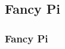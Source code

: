    	     \subsection[]{Fancy Pi}
   	     \begin{frame}
   	     	\frametitle{Fancy Pi}
   	     	
   	     	   \def\defaultstartht{20pt}
   	     	   \diminish[0.97]{\pinum}
   	     	   
   	     \end{frame}
   	     